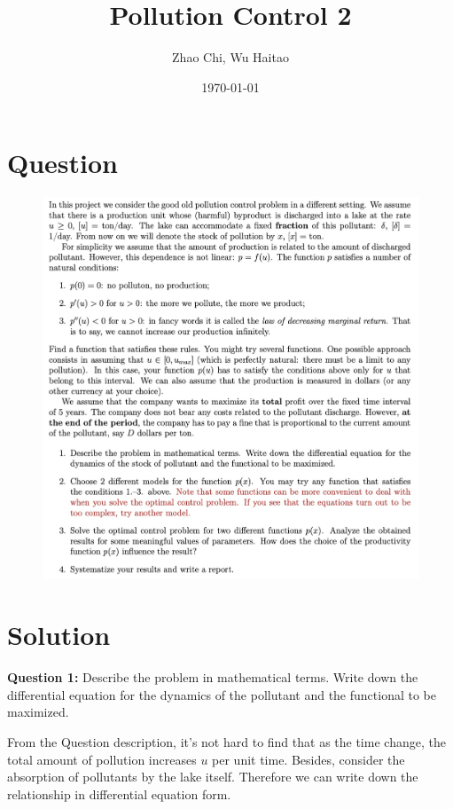 \documentclass{article}
\title{Pollution Control 2}
\author{Zhao Chi, Wu Haitao}
\date{\today}
\newlength\imagewidth
\begin{document}
    \maketitle
\section*{Question}

\begin{figure}[ht]
    \centering
    \includegraphics[width=2.2\imagewidth]{Question.png}
\end{figure}


\section*{Solution}

{\bf Question 1:} Describe the problem in mathematical terms. Write down the differential equation for the dynamics of the pollutant and the functional to be maximized.

From the Question description, it's not hard to find that as the time change, the total amount of pollution increases $u$ per unit time. Besides, consider the absorption of pollutants by the lake itself. Therefore we can write down the relationship in differential equation form.
\end{document}
